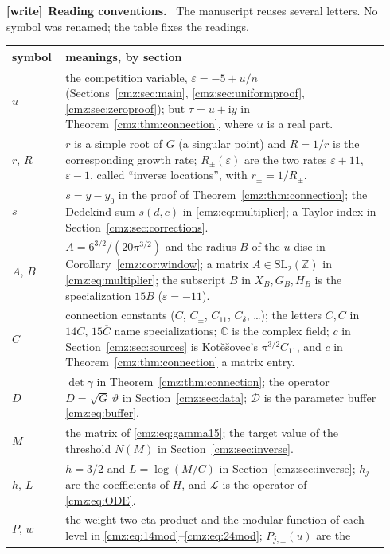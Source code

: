 \documentclass[11pt,letterpaper]{article}
\numberwithin{equation}{section}
\theoremstyle{definition}\newtheorem{definition}[theorem]{Definition}
\theoremstyle{remark}\newtheorem{remark}[theorem]{Remark}
\newcommand{\eps}{\varepsilon}
\newcommand{\ii}{\mathrm i}
\newcommand{\C}{\mathbb C}
\newcommand{\Z}{\mathbb Z}
\newcommand{\tht}{\vartheta}
\newcommand{\disc}{\mathcal D}
\newenvironment{writenote}[1][]{\par\smallskip\begingroup\small
 \noindent\textbf{[write]}\if\relax\detokenize{#1}\relax\else~\textbf{#1.}\fi\ }%
 {\par\endgroup\smallskip}
\begin{document}
\begin{writenote}[Reading conventions]
The manuscript reuses several letters. No symbol was renamed; the table
fixes the readings.

\smallskip
\noindent\begin{tabular}{@{}>{\raggedright\arraybackslash}p{0.13\linewidth}
 >{\raggedright\arraybackslash}p{0.81\linewidth}@{}}
\toprule
symbol & meanings, by section \\
\midrule
$u$ & the competition variable, $\eps=-5+u/n$ (Sections~\ref{cmz:sec:main},
 \ref{cmz:sec:uniformproof}, \ref{cmz:sec:zeroproof}); but $\tau=u+\ii y$
 in Theorem~\ref{cmz:thm:connection}, where $u$ is a real part. \\
$r$, $R$ & $r$ is a simple root of $G$ (a singular point) and $R=1/r$ is
 the corresponding growth rate; $R_\pm(\eps)$ are the two rates
 $\eps+11$, $\eps-1$, called ``inverse locations'', with $r_\pm=1/R_\pm$. \\
$s$ & $s=y-y_0$ in the proof of Theorem~\ref{cmz:thm:connection}; the
 Dedekind sum $s(d,c)$ in \eqref{cmz:eq:multiplier}; a Taylor index in
 Section~\ref{cmz:sec:corrections}. \\
$A$, $B$ & $A=6^{3/2}/(20\pi^{3/2})$ and the radius $B$ of the $u$-disc in
 Corollary~\ref{cmz:cor:window}; a matrix $A\in\mathrm{SL}_2(\Z)$ in
 \eqref{cmz:eq:multiplier}; the subscript $B$ in $X_B,G_B,H_B$ is the
 specialization $15B$ ($\eps=-11$). \\
$C$ & connection constants ($C$, $C_\pm$, $C_{11}$, $C_\delta$, \dots); the
 letters $C,\overline C$ in $14C$, $15\overline C$ name specializations; $\C$
 is the complex field; $c$ in Section~\ref{cmz:sec:sources} is
 Kot\v{e}\v{s}ovec's $\pi^{3/2}C_{11}$, and $c$ in
 Theorem~\ref{cmz:thm:connection} a matrix entry. \\
$D$ & $\det\gamma$ in Theorem~\ref{cmz:thm:connection}; the operator
 $D=\sqrt G\,\tht$ in Section~\ref{cmz:sec:data}; $\disc$ is the parameter
 buffer \eqref{cmz:eq:buffer}. \\
$M$ & the matrix of \eqref{cmz:eq:gamma15}; the target value of the
 threshold $N(M)$ in Section~\ref{cmz:sec:inverse}. \\
$h$, $L$ & $h=3/2$ and $L=\log(M/C)$ in Section~\ref{cmz:sec:inverse};
 $h_j$ are the coefficients of $H$, and $\mathcal L$ is the operator of
 \eqref{cmz:eq:ODE}. \\
$P$, $w$ & the weight-two eta product and the modular function of each
 level in \eqref{cmz:eq:14mod}--\eqref{cmz:eq:24mod}; $P_{j,\pm}(u)$ are the

\end{tabular}
\end{writenote}
\end{document}
